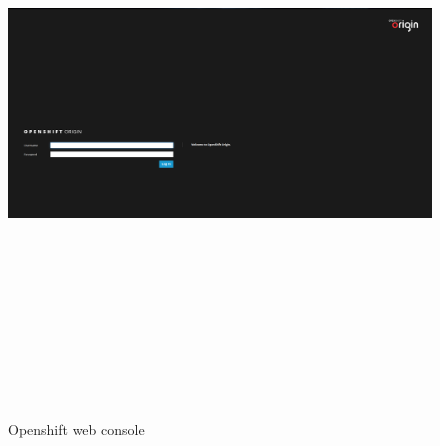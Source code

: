\documentclass[11pt]{report}
\begin{document}
	\ \\
	\begin{figure}[h!]
    	\begin{center}
    	   	\includegraphics[width=18cm,height=16cm]{openshiftwebconsole.png}
    		\caption{Openshift web console}
    	  \end{center}
	  
	\end{figure}
	\ \\
	\pagebreak
	\ \\
\end{document}
